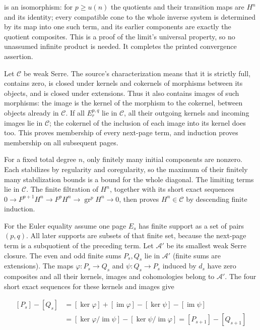 \documentclass[11pt]{article}
\begin{document}
is an isomorphism: for \(p\geq u(n)\) the quotients and their transition maps are \(H^n\) and its identity; every compatible cone to the whole inverse system is determined by its map into one such term, and its earlier components are exactly the quotient composites. This is a proof of the limit's universal property, so no unassumed infinite product is needed. It completes the printed convergence assertion.

Let \(\mathcal C\) be weak Serre. The source's characterization means that it is strictly full, contains zero, is closed under kernels and cokernels of morphisms between its objects, and is closed under extensions. Thus it also contains images of such morphisms: the image is the kernel of the morphism to the cokernel, between objects already in \(\mathcal C\). If all \(E_r^{p,q}\) lie in \(\mathcal C\), all their outgoing kernels and incoming images lie in \(\mathcal C\); the cokernel of the inclusion of each image into its kernel does too. This proves membership of every next-page term, and induction proves membership on all subsequent pages.

For a fixed total degree \(n\), only finitely many initial components are nonzero. Each stabilizes by regularity and coregularity, so the maximum of their finitely many stabilization bounds is a bound for the whole diagonal. The limiting terms lie in \(\mathcal C\). The finite filtration of \(H^n\), together with its short exact sequences \(0\to F^{p+1}H^n\to F^pH^n\to\operatorname{gr}^pH^n\to0\), then proves \(H^n\in\mathcal C\) by descending finite induction.

For the Euler equality assume one page \(E_s\) has finite support as a set of pairs \((p,q)\). All later supports are subsets of that finite set, because the next-page term is a subquotient of the preceding term. Let \(\mathcal A'\) be its smallest weak Serre closure. The even and odd finite sums \(P_s,Q_s\) lie in \(\mathcal A'\) (finite sums are extensions). The maps \(\varphi:P_s\to Q_s\) and \(\psi:Q_s\to P_s\) induced by \(d_s\) have zero composites and all their kernels, images and cohomologies belong to \(\mathcal A'\). The four short exact sequences for these kernels and images give

\[
\begin{aligned}
[P_s]-[Q_s]
&=[\ker\varphi]+[\operatorname{im}\varphi]
 -[\ker\psi]-[\operatorname{im}\psi]\\
&=[\ker\varphi/\operatorname{im}\psi]
 -[\ker\psi/\operatorname{im}\varphi]
=[P_{s+1}]-[Q_{s+1}]
\end{aligned}                                             \tag{2.2}
\]
\end{document}
